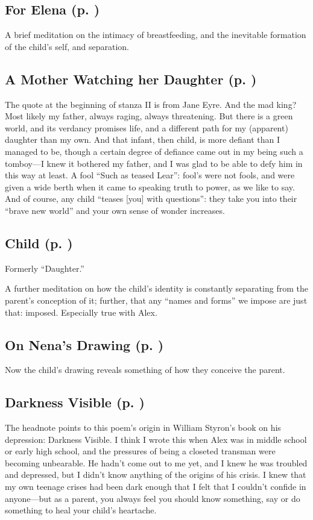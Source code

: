 \subsection{For Elena (p. \pageref{ch:forelena})}
A brief meditation on the intimacy of breastfeeding, and the inevitable formation of the child's self, and separation.

\subsection{A Mother Watching her Daughter (p. \pageref{ch:amotherwatching})}
The quote at the beginning of stanza II is from Jane Eyre. And the mad king?
Most likely my father, always raging, always threatening. But there is a green
world, and its verdancy promises life, and a different path for my (apparent)
daughter than my own. And that infant, then child, is more defiant than I
managed to be, though a certain degree of defiance came out in my being such a
tomboy---I knew it bothered my father, and I was glad to be able to defy him in
this way at least. A fool ``Such as teased Lear'': fool's were not fools, and
were given a wide berth when it came to speaking truth to power, as we like to
say. And of course, any child ``teases [you] with questions'': they take you
into their ``brave new world'' and your own sense of wonder increases.

\subsection{Child (p. \pageref{ch:child})}
Formerly ``Daughter.''

A further meditation on how the child's identity is
constantly separating from the parent's conception of it; further, that any
``names and forms'' we impose are just that: imposed. Especially true with Alex.

\subsection{On Nena's Drawing (p. \pageref{ch:onnena})}
Now the child's drawing reveals something of how they conceive the parent.

\subsection{Darkness Visible (p. \pageref{ch:darknessvisible})}
The headnote points to this poem's origin in William Styron's book on his
depression: Darkness Visible. I think I wrote this when Alex was in middle
school or early high school, and the pressures of being a closeted transman were
becoming unbearable. He hadn't come out to me yet, and I knew he was troubled
and depressed, but I didn't know anything of the origins of his crisis. I knew
that my own teenage crises had been dark enough that I felt that I couldn't
confide in anyone---but as a parent, you always feel you should know something,
say or do something to heal your child's heartache.

